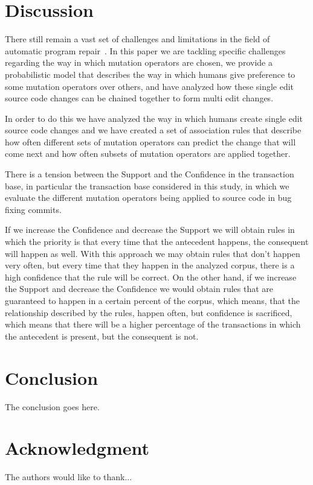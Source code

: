 \documentclass[conference]{IEEEtran}
\begin{document}
\section{Discussion}
There still remain a vast set of challenges and limitations in the field of automatic program repair~\cite{Qi15}. In this paper we are tackling specific challenges regarding the way in which mutation operators are chosen, we provide a probabilistic model that describes the way in which humans give preference to some mutation operators over others, and have analyzed how these single edit source code changes can be chained together to form multi edit changes.

In order to do this we have analyzed the way in which humans create single edit source code changes and we have created a set of association rules that describe how often different sets of mutation operators can predict the change that will come next and how often subsets of mutation operators are applied together.

There is a tension between the Support and the Confidence in the transaction base, in particular the transaction base considered in this study, in which we evaluate the different mutation operators being applied to source code in bug fixing commits. 

If we increase the Confidence and decrease the Support we will obtain rules in which the priority is that every time that the antecedent happens, the consequent will happen as well. With this approach we may obtain rules that don't happen very often, but every time that they happen in the analyzed corpus, there is a high confidence that the rule will be correct. On the other hand, if we increase the Support and decrease the Confidence we would obtain rules that are guaranteed to happen in a certain percent of the corpus, which means, that the relationship described by the rules, happen often, but confidence is sacrificed, which means that there will be a higher percentage of the transactions in which the antecedent is present, but the consequent is not. 


\section{Conclusion}
The conclusion goes here.






\section*{Acknowledgment}
The authors would like to thank...
\end{document}
